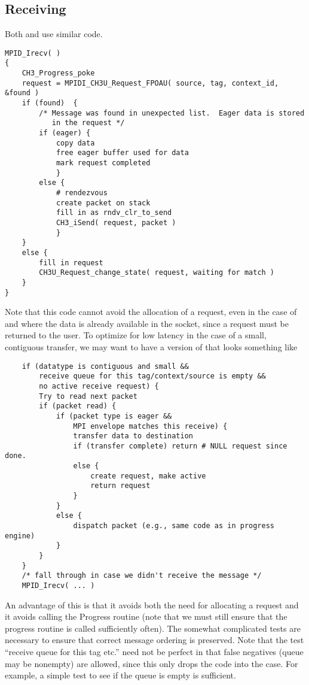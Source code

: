 \documentclass{article}
\begin{document}
\subsection{Receiving}
Both  and  use similar code.

\begin{verbatim}
MPID_Irecv( )
{
    CH3_Progress_poke
    request = MPIDI_CH3U_Request_FPOAU( source, tag, context_id, &found )
    if (found)  {
        /* Message was found in unexpected list.  Eager data is stored
           in the request */
        if (eager) {
            copy data
            free eager buffer used for data
            mark request completed
            }
        else {
            # rendezvous
            create packet on stack
            fill in as rndv_clr_to_send
            CH3_iSend( request, packet )
            }
    }
    else {
        fill in request
        CH3U_Request_change_state( request, waiting for match )
    }
}
\end{verbatim}

Note that this code cannot avoid the allocation of a request, even in
the case of  and where the data is already available in the
socket, since a request must be returned to the user.  To
optimize for low latency in the case of a small, contiguous transfer,
we may want to have a version of  that looks something
like
\begin{verbatim}
    if (datatype is contiguous and small &&
        receive queue for this tag/context/source is empty &&
        no active receive request) {
        Try to read next packet
        if (packet read) {
            if (packet type is eager &&
                MPI envelope matches this receive) {
                transfer data to destination
                if (transfer complete) return # NULL request since done.
                else {
                    create request, make active
                    return request
                }
            }
            else {
                dispatch packet (e.g., same code as in progress engine)
            }
        } 
    }
    /* fall through in case we didn't receive the message */
    MPID_Irecv( ... )
\end{verbatim}
An advantage of this is that it avoids both the need for allocating a
request and it avoids calling the Progress routine (note that we must
still ensure that the progress routine is called sufficiently often).
The somewhat complicated tests are necessary to ensure that correct message
ordering is preserved. Note that the test ``receive queue for this tag
etc.'' need not be perfect in that false negatives (queue may be
nonempty) are allowed, since this only drops the code into the
 case.  For example, a simple test to see if the
queue is empty is sufficient.
\end{document}
